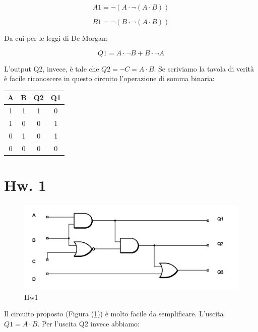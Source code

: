 \documentclass[journal, a4paper]{IEEEtran}
\begin{document}
\begin{equation}
A1 = \lnot(A \cdot \lnot(A \cdot B)) 
\end{equation}

\begin{equation}
B1 = \lnot(B \cdot \lnot(A \cdot B)) 
\end{equation}

Da cui per le leggi di De Morgan:

\begin{equation}
Q1 = A \cdot \lnot B + B \cdot \lnot A
\end{equation}

L'output Q2, invece, è tale che $Q2 = \lnot C = A \cdot B$. Se scriviamo la tavola di verità è facile riconoscere in questo circuito l'operazione di somma binaria:

\begin{table}[h]
\centering
\begin{tabular}{c|c||c|c}
\hline \textbf{A} & \textbf{B} & \textbf{Q2} & \textbf{Q1} \\ 
\hline 1 & 1 & 1 & 0 \\ 
 1 & 0 & 0 & 1 \\ 
 0 & 1 & 0 & 1 \\ 
 0 & 0 & 0 & 0 \\ 
\hline
 
\end{tabular} 
\end{table}


\section{Hw. 1}

\begin{figure}
\centering
\includegraphics[width=0.8\linewidth]{./hw1}
\caption{Hw1}
\label{fig:hw1}
\end{figure}

Il circuito proposto (Figura (\ref{fig:hw1})) è molto facile da semplificare. L'uscita $Q1 = A \cdot B$. Per l'uscita Q2 invece abbiamo:
\end{document}
